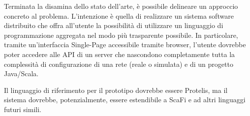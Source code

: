   Terminata la disamina dello stato dell'arte, è possibile delineare un approccio concreto al problema.
  L'intenzione è quella di realizzare un sistema software distribuito che offra all'utente la possibilità di utilizzare un linguaggio di programmazione aggregata nel modo più trasparente possibile.
  In particolare, tramite un'interfaccia Single-Page accessibile tramite browser, l'utente dovrebbe poter accedere alle API di un server che nascondono completamente tutta la complessità di configurazione di una rete (reale o simulata) e di un progetto Java/Scala.

  Il linguaggio di riferimento per il prototipo dovrebbe essere Protelis, ma il sistema dovrebbe, potenzialmente, essere estendibile a ScaFi e ad altri linguaggi futuri simili.
